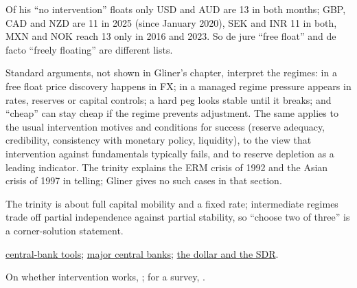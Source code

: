 \begin{qfdefinition}
Of his ``no intervention'' floats only USD and AUD are 13 in both months; GBP, CAD and NZD are 11 in 2025 (since January 2020), SEK and INR 11 in both, MXN and NOK reach 13 only in 2016 and 2023. So de jure ``free float'' and de facto ``freely floating'' are different lists.

 Standard arguments, not shown in Gliner's chapter, interpret the regimes: in a free float price discovery happens in FX; in a managed regime pressure appears in rates, reserves or capital controls; a hard peg looks stable until it breaks; and ``cheap'' can stay cheap if the regime prevents adjustment. The same applies to the usual intervention motives and conditions for success (reserve adequacy, credibility, consistency with monetary policy, liquidity), to the view that intervention against fundamentals typically fails, and to reserve depletion as a leading indicator. The trinity explains the ERM crisis of 1992 and the Asian crisis of 1997 in telling; Gliner gives no such cases in that section.

 The trinity is about full capital mobility and a fixed rate; intermediate regimes trade off partial independence against partial stability, so ``choose two of three'' is a corner-solution statement.

 \hyperref[def:central-bank-policy-framework]{central-bank tools}; \hyperref[rule:major-central-banks-current]{major central banks}; \hyperref[def:us-dollar-dxy-sdr]{the dollar and the SDR}.

 On whether intervention works, \citep{cur-fratzscher-et-al-2019}; for a survey, \citep{cur-menkhoff-2013}.

\end{qfdefinition}
